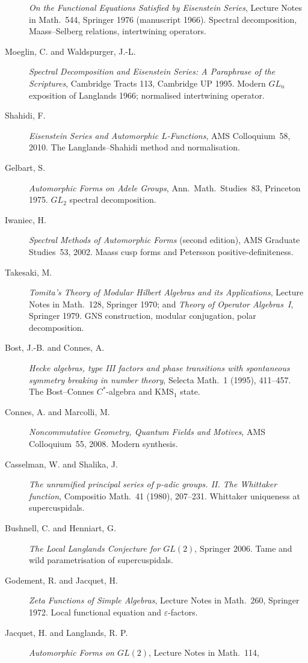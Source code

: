 \begin{description}
\emph{On the Functional Equations Satisfied by Eisenstein Series},
Lecture Notes in Math.~544, Springer 1976 (manuscript 1966).
Spectral decomposition, Maass--Selberg relations, intertwining
operators.
\item[Moeglin, C. and Waldspurger, J.-L.]
\emph{Spectral Decomposition and Eisenstein Series: A Paraphrase of
the Scriptures}, Cambridge Tracts 113, Cambridge UP 1995. Modern
\(GL_{n}\) exposition of Langlands 1966; normalised intertwining
operator.
\item[Shahidi, F.]
\emph{Eisenstein Series and Automorphic \(L\)-Functions}, AMS
Colloquium~58, 2010. The Langlands--Shahidi method and
normalisation.
\item[Gelbart, S.]
\emph{Automorphic Forms on Adele Groups}, Ann.~Math.~Studies~83,
Princeton 1975. \(GL_{2}\) spectral decomposition.
\item[Iwaniec, H.]
\emph{Spectral Methods of Automorphic Forms} (second edition), AMS
Graduate Studies~53, 2002. Maass cusp forms and Petersson
positive-definiteness.
\item[Takesaki, M.]
\emph{Tomita's Theory of Modular Hilbert Algebras and its
Applications}, Lecture Notes in Math.~128, Springer 1970; and
\emph{Theory of Operator Algebras~I}, Springer 1979. GNS
construction, modular conjugation, polar decomposition.
\item[Bost, J.-B. and Connes, A.]
\emph{Hecke algebras, type III factors and phase transitions with
spontaneous symmetry breaking in number theory}, Selecta Math.~1
(1995), 411--457. The Bost--Connes \(C^{*}\)-algebra and KMS\({}_{1}\)
state.
\item[Connes, A. and Marcolli, M.]
\emph{Noncommutative Geometry, Quantum Fields and Motives}, AMS
Colloquium~55, 2008. Modern synthesis.
\item[Casselman, W. and Shalika, J.]
\emph{The unramified principal series of \(p\)-adic groups. II. The
Whittaker function}, Compositio Math.~41 (1980), 207--231. Whittaker
uniqueness at supercuspidals.
\item[Bushnell, C. and Henniart, G.]
\emph{The Local Langlands Conjecture for \(GL(2)\)}, Springer 2006.
Tame and wild parametrisation of supercuspidals.
\item[Godement, R. and Jacquet, H.]
\emph{Zeta Functions of Simple Algebras}, Lecture Notes in Math.~260,
Springer 1972. Local functional equation and \(\varepsilon\)-factors.
\item[Jacquet, H. and Langlands, R. P.]
\emph{Automorphic Forms on \(GL(2)\)}, Lecture Notes in Math.~114,

\end{description}
